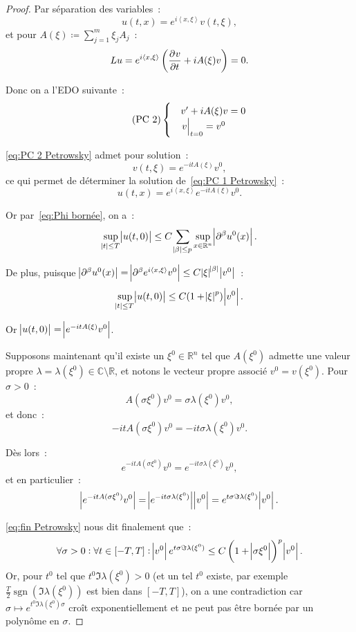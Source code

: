 \documentclass{report}
\DeclareMathOperator{\sgn}{sgn}
\newcommand{\C}{{\mathbb C}}
\newcommand{\R}{{\mathbb R}}
\newcommand{\scpr}[2]{\left\langle#1, #2\right\rangle}
\newcommand{\restr}[2]{\left.#1\vphantom{\big|}\right|_{#2}}
\theoremstyle{definition}
\theoremstyle{remark}
\begin{document}
\begin{proof}
Par séparation des variables~:
\[u(t, x) = e^{i\scpr x\xi} v(t, \xi),\]
et pour $A(\xi) \coloneqq \sum_{j=1}^m\xi_jA_j$~:
\[Lu = e^{i\scpr x\xi}\left(\dpd vt + iA(\xi)v\right) = 0.\]

Donc on a l'EDO suivante~:
\begin{equation}\label{eq:PC 2 Petrowsky}\tag{PC~2}
	\begin{cases}
		&v' + iA(\xi)v = 0 \\
		&\restr v{t=0} = v^0
	\end{cases}
\end{equation}

\eqref{eq:PC 2 Petrowsky} admet pour solution~:
\[v(t, \xi) = e^{-itA(\xi)}v^0,\]
ce qui permet de déterminer la solution de~\eqref{eq:PC 1 Petrowsky}~:
\[u(t, x) = e^{i\scpr x\xi}e^{-itA(\xi)}v^0.\]

Or par~\eqref{eq:Phi bornée}, on a~:
\begin{equation}\label{eq:fin Petrowsky}
	\sup_{\abs t \leq T}\abs {u(t, 0)} \leq C\sum_{\abs \beta \leq p}\sup_{x \in \R^n}\abs {\partial^\beta u^0(x)}.
\end{equation}

De plus, puisque $\abs {\partial^\beta u^0(x)} = \abs {\partial^\beta e^{i\scpr x\xi}v^0} \leq C\abs \xi^{\abs \beta}\abs {v^0}$~:
\[\sup_{\abs t \leq T}\abs {u(t, 0)} \leq C(1+\abs \xi^p)\abs {v^0}.\]

Or $\abs {u(t, 0)} = \abs {e^{-itA(\xi)}v^0}$.

Supposons maintenant qu'il existe un $\xi^0 \in \R^n$ tel que $A(\xi^0)$ admette une valeur propre $\lambda = \lambda(\xi^0) \in \C \setminus \R$,
et notons le vecteur propre associé $v^0 = v(\xi^0)$. Pour $\sigma > 0$~:
\[A(\sigma\xi^0)v^0 = \sigma\lambda(\xi^0)v^0,\]
et donc~:
\[-itA(\sigma\xi^0)v^0 = -it\sigma\lambda(\xi^0)v^0.\]

Dès lors~:
\[e^{-itA(\sigma\xi^0)}v^0 = e^{-it\sigma\lambda(\xi^0)}v^0,\]
et en particulier~:
\[\abs {e^{-itA(\sigma\xi^0)}v^0} = \abs {e^{-it\sigma\lambda(\xi^0)}}\abs {v^0} = e^{t\sigma\Im\lambda(\xi^0)}\abs {v^0}.\]

\eqref{eq:fin Petrowsky} nous dit finalement que~:
\[\forall \sigma > 0 : \forall t \in [-T, T] : \abs {v^0}e^{t\sigma\Im\lambda(\xi^0)} \leq C\left(1 + \abs {\sigma\xi^0}\right)^p\abs {v^0}.\]
Or, pour $t^0$ tel que $t^0\Im\lambda(\xi^0) > 0$ (et un tel $t^0$ existe, par exemple $\frac T2\sgn(\Im\lambda(\xi^0))$ est bien dans $[-T, T]$), on a une contradiction car
$\sigma \mapsto e^{t^0\Im\lambda(\xi^0)\sigma}$ croît exponentiellement et ne peut pas être bornée par un polynôme en $\sigma$.
\end{proof}
\end{document}
